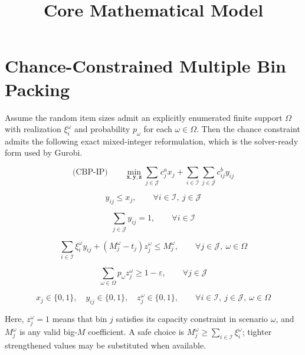 \documentclass{article}
\title{Core Mathematical Model}
\date{}
\begin{document}
\maketitle

\section*{Chance-Constrained Multiple Bin Packing}

Assume the random item sizes admit an explicitly enumerated finite support
$\Omega$ with realization $\xi_i^\omega$ and probability $p_\omega$ for each
$\omega \in \Omega$. Then the chance constraint admits the following exact
mixed-integer reformulation, which is the solver-ready form used by Gurobi.

\begin{equation}
\text{(CBP-IP)} \qquad \min_{\boldsymbol{x}, \boldsymbol{y}, \boldsymbol{z}}
\sum_{j \in \mathcal{J}} c_j^a x_j
+ \sum_{i \in \mathcal{I}} \sum_{j \in \mathcal{J}} c_{ij}^b y_{ij}
\tag{1a}
\end{equation}

\begin{equation}
y_{ij} \le x_j,
\qquad \forall i \in \mathcal{I},\ j \in \mathcal{J}
\tag{1b}
\end{equation}

\begin{equation}
\sum_{j \in \mathcal{J}} y_{ij} = 1,
\qquad \forall i \in \mathcal{I}
\tag{1c}
\end{equation}

\begin{equation}
\sum_{i \in \mathcal{I}} \xi_i^\omega y_{ij}
+ \left(M_j^\omega - t_j\right) z_j^\omega
\le M_j^\omega,
\qquad \forall j \in \mathcal{J},\ \omega \in \Omega
\tag{1d}
\end{equation}

\begin{equation}
\sum_{\omega \in \Omega} p_\omega z_j^\omega \ge 1 - \varepsilon,
\qquad \forall j \in \mathcal{J}
\tag{1e}
\end{equation}

\begin{equation}
x_j \in \{0,1\}, \quad y_{ij} \in \{0,1\}, \quad z_j^\omega \in \{0,1\},
\qquad \forall i \in \mathcal{I},\ j \in \mathcal{J},\ \omega \in \Omega
\tag{1f}
\end{equation}

Here, $z_j^\omega = 1$ means that bin $j$ satisfies its capacity constraint in
scenario $\omega$, and $M_j^\omega$ is any valid big-$M$ coefficient. A safe
choice is $M_j^\omega \ge \sum_{i \in \mathcal{I}} \xi_i^\omega$; tighter
strengthened values may be substituted when available.
\end{document}
